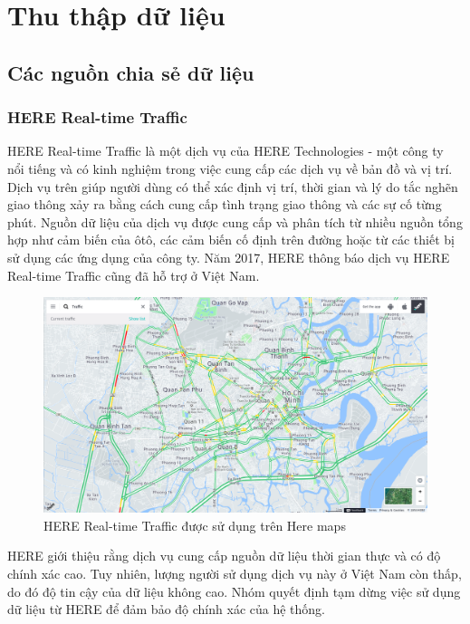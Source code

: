 \chapter{Thu thập dữ liệu} %
\label{Chapter3}

\section{Các nguồn chia sẻ dữ liệu} %
\subsection{HERE Real-time Traffic}
HERE Real-time Traffic là một dịch vụ của HERE Technologies - một công ty nổi tiếng và có kinh nghiệm trong việc cung cấp các dịch vụ về bản đồ và vị trí. Dịch vụ trên giúp người dùng có thể xác định vị trí, thời gian và lý do tắc nghẽn giao thông xảy ra bằng cách cung cấp tình trạng giao thông và các sự cố từng phút. Nguồn dữ liệu của dịch vụ được cung cấp và phân tích từ nhiều nguồn tổng hợp như cảm biến của ôtô, các cảm biến cố định trên đường hoặc từ các thiết bị sử dụng các ứng dụng của công ty. Năm 2017, HERE thông báo dịch vụ HERE Real-time Traffic cũng đã hỗ trợ ở Việt Nam.\cite{HERE}

\begin{figure}[!ht]
	\begin{center}
		\includegraphics[width=1.0\textwidth]{images/here_maps.png}
	\end{center}
	\caption{HERE Real-time Traffic được sử dụng trên Here maps}
\end{figure}

HERE giới thiệu rằng dịch vụ cung cấp nguồn dữ liệu thời gian thực và có độ chính xác cao. Tuy nhiên, lượng người sử dụng dịch vụ này ở Việt Nam còn thấp, do đó độ tin cậy của dữ liệu không cao. Nhóm quyết định tạm dừng việc sử dụng dữ liệu từ HERE để đảm bảo độ chính xác của hệ thống.
